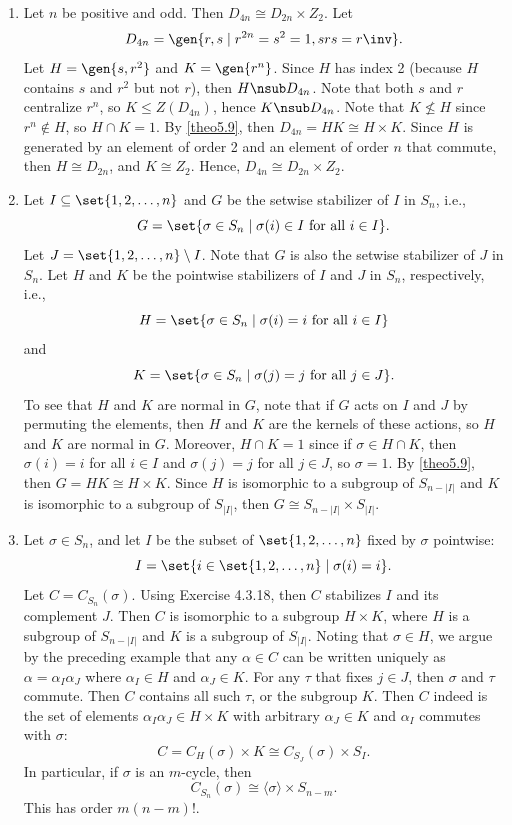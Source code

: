 \begin{ex}
    \begin{enumerate}
        \item Let $n$ be positive and odd. Then $D_{4n} \cong D_{2n} \times Z_2$. Let
        \[D_{4n} = \gen{r, s \mid r^{2n} = s^2 = 1, srs = r\inv}.\]
        Let $H = \gen{s, r^2}$ and $K = \gen{r^n}$. Since $H$ has index 2 (because $H$ contains $s$ and $r^2$ but not $r$), then $H \nsub D_{4n}$. Note that both $s$ and $r$ centralize $r^n$, so $K \leq Z(D_{4n})$, hence $K \nsub D_{4n}$. Note that $K \not\leq H$ since $r^n \notin H$, so $H \cap K = 1$. By \autoref{theo5.9}, then $D_{4n} = HK \cong H \times K$. Since $H$ is generated by an element of order 2 and an element of order $n$ that commute, then $H \cong D_{2n}$, and $K \cong Z_2$. Hence, $D_{4n} \cong D_{2n} \times Z_2$.
        \item Let $I \subseteq \set{1, 2, \ldots, n}$ and $G$ be the setwise stabilizer of $I$ in $S_n$, i.e.,
        \[G = \set{\sigma \in S_n \mid \sigma(i) \in I \text{ for all } i \in I}.\]
        Let $J = \set{1, 2, \ldots, n} \setminus I$. Note that $G$ is also the setwise stabilizer of $J$ in $S_n$. Let $H$ and $K$ be the pointwise stabilizers of $I$ and $J$ in $S_n$, respectively, i.e.,
        \[H = \set{\sigma \in S_n \mid \sigma(i) = i \text{ for all } i \in I}\]
        and
        \[K = \set{\sigma \in S_n \mid \sigma(j) = j \text{ for all } j \in J}.\]
        To see that $H$ and $K$ are normal in $G$, note that if $G$ acts on $I$ and $J$ by permuting the elements, then $H$ and $K$ are the kernels of these actions, so $H$ and $K$ are normal in $G$. Moreover, $H \cap K = 1$ since if $\sigma \in H \cap K$, then $\sigma(i) = i$ for all $i \in I$ and $\sigma(j) = j$ for all $j \in J$, so $\sigma = 1$. By \autoref{theo5.9}, then $G = HK \cong H \times K$. Since $H$ is isomorphic to a subgroup of $S_{n - |I|}$ and $K$ is isomorphic to a subgroup of $S_{|I|}$, then $G \cong S_{n - |I|} \times S_{|I|}$.
        \item Let $\sigma \in S_n$, and let $I$ be the subset of $\set{1, 2, \ldots, n}$ fixed by $\sigma$ pointwise:
        \[I = \set{i \in \set{1, 2, \ldots, n} \mid \sigma(i) = i}.\]
        Let $C = C_{S_n}(\sigma)$. Using Exercise 4.3.18, then $C$ stabilizes $I$ and its complement $J$. Then $C$ is isomorphic to a subgroup $H \times K$, where $H$ is a subgroup of $S_{n - |I|}$ and $K$ is a subgroup of $S_{|I|}$. Noting that $\sigma \in H$, we argue by the preceding example that any $\alpha \in C$ can be written uniquely as $\alpha = \alpha_I\alpha_J$ where $\alpha_I \in H$ and $\alpha_J \in K$. For any $\tau$ that fixes $j \in J$, then $\sigma$ and $\tau$ commute. Then $C$ contains all such $\tau$, or the subgroup $K$. Then $C$ indeed is the set of elements $\alpha_I\alpha_J \in H \times K$ with arbitrary $\alpha_J \in K$ and $\alpha_I$ commutes with $\sigma$:
        \[C = C_H(\sigma) \times K \cong C_{S_J}(\sigma) \times S_I.\]
        In particular, if $\sigma$ is an $m$-cycle, then
        \[C_{S_n}(\sigma) \cong \langle \sigma \rangle \times S_{n-m}.\]
        This has order $m(n - m)!$.
    \end{enumerate}
\end{ex}


